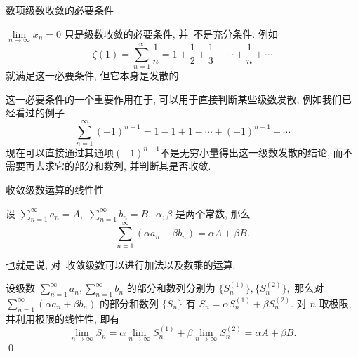 
\begin{frame}{数项级数收敛的必要条件}

\begin{attnblock}
$\lim\limits_{n\to\infty} x_n = 0$ 只是级数收敛的必要条件, 并~{\color{red}不是充分条件}. 例如
\[\zeta(1) = \sum\limits_{n=1}^{\infty} \dfrac{1}{n} = 1 + \dfrac{1}{2} + \dfrac{1}{3} + \cdots + \dfrac{1}{n} + \cdots\]
就满足这一必要条件, 但它本身是发散的.
\end{attnblock}

\pause
\vspace*{0.5em}

这一必要条件的一个重要作用在于, 可以用于直接判断某些级数发散, 例如我们已经看过的例子
\[\sum\limits_{n=1}^\infty (-1)^{n-1} = 1 - 1 + 1 - \cdots + (-1)^{n-1} + \cdots\]
现在可以直接通过其通项$(-1)^{n-1}$不是无穷小量得出这一级数发散的结论, 而不需要再去求它的部分和数列, 并判断其是否收敛.

\end{frame}


\begin{frame}{收敛级数运算的线性性}

\begin{thm}[收敛级数运算的线性性]
设 $\sum\limits_{n=1}^\infty a_n = A,$ $\sum\limits_{n=1}^\infty b_n = B,$ $\alpha, \beta$ 是两个常数, 那么
\[\sum\limits_{n=1}^\infty (\alpha a_n + \beta b_n) = \alpha A + \beta B.\]
\end{thm}

也就是说, 对~{\color{red}收敛级数}可以进行加法以及数乘的运算.

\pause
\vspace{0.5em}

\startproof[bg=yellow, fg=red]
设级数 $\sum\limits_{n=1}^\infty a_n, \sum\limits_{n=1}^\infty b_n$ 的部分和数列分别为 $\{S_n^{(1)}\}, \{S_n^{(2)}\},$ 那么对 $\sum\limits_{n=1}^\infty (\alpha a_n + \beta b_n)$ 的部分和数列 $\{S_n\}$ 有 $S_n = \alpha S_n^{(1)} + \beta S_n^{(2)}.$ 对 $n$ 取极限, 并利用极限的线性性, 即有
\[\lim\limits_{n\to\infty} S_n = \alpha \lim\limits_{n\to\infty} S_n^{(1)} + \beta \lim\limits_{n\to\infty} S_n^{(2)} = \alpha A + \beta B.\]
\qed

\end{frame}


